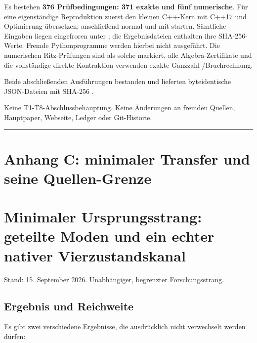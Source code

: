 Es bestehen \textbf{376 Prüfbedingungen: 371 exakte und fünf
numerische}. Für eine eigenständige Reproduktion zuerst den kleinen
C++-Kern mit C++17 und Optimierung übersetzen; anschließend
 normal und mit  starten. Sämtliche
Eingaben liegen eingefroren unter ; die
Ergebnisdateien enthalten ihre SHA-256-Werte. Fremde Pythonprogramme
werden hierbei nicht ausgeführt. Die numerischen Ritz-Prüfungen sind als
solche markiert, alle Algebra-Zertifikate und die vollständige direkte
Kontraktion verwenden exakte Ganzzahl-/Bruchrechnung.

Beide abschließenden Ausführungen bestanden und lieferten byteidentische
JSON-Dateien mit SHA-256
.

Keine T1-T8-Abschlussbehauptung. Keine Änderungen an fremden Quellen,
Hauptpaper, Webseite, Ledger oder Git-Historie.

\begin{center}\rule{0.5\linewidth}{0.5pt}\end{center}

\section{Anhang C: minimaler Transfer und seine
Quellen-Grenze}\label{anhang-c-minimaler-transfer-und-seine-quellen-grenze}

\section{Minimaler Ursprungsstrang: geteilte Moden und ein echter
nativer
Vierzustandskanal}\label{minimaler-ursprungsstrang-geteilte-moden-und-ein-echter-nativer-vierzustandskanal}

Stand: 15. September 2026. Unabhängiger, begrenzter Forschungsstrang.

\subsection{Ergebnis und Reichweite}\label{ergebnis-und-reichweite}

Es gibt zwei verschiedene Ergebnisse, die ausdrücklich nicht verwechselt
werden dürfen:

